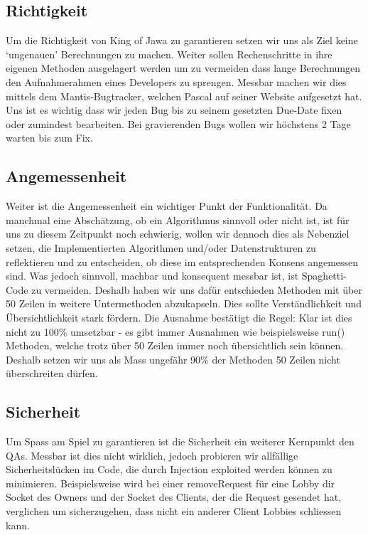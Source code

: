 \documentclass{scrartcl}
\begin{document}
\subsection{Richtigkeit}
\label{sec:Richtigkeit}

Um die Richtigkeit von King of Jawa zu garantieren setzen wir uns als Ziel keine ‘ungenauen’ Berechnungen zu machen. Weiter sollen Rechenschritte in ihre eigenen Methoden ausgelagert werden um zu vermeiden dass lange Berechnungen den Aufnahmerahmen eines Developers zu sprengen. Messbar machen wir dies mittels dem Mantis-Bugtracker, welchen Pascal auf seiner Website aufgesetzt hat. Uns ist es wichtig dass wir jeden Bug bis zu seinem gesetzten Due-Date fixen oder zumindest bearbeiten. Bei gravierenden Bugs wollen wir höchstens 2 Tage warten bis zum Fix. 

\subsection{Angemessenheit}
Weiter ist die Angemessenheit ein wichtiger Punkt der Funktionalität. Da manchmal eine Abschätzung, ob ein Algorithmus sinnvoll oder nicht ist, ist  für uns zu diesem Zeitpunkt noch schwierig, wollen wir dennoch dies als Nebenziel setzen, die Implementierten Algorithmen und/oder Datenstrukturen zu reflektieren und zu entscheiden, ob diese im entsprechenden Konsens angemessen sind. Was jedoch sinnvoll, machbar und konsequent messbar ist, ist Spaghetti-Code zu vermeiden. Deshalb haben wir uns dafür entschieden Methoden mit über 50 Zeilen in weitere Untermethoden abzukapseln. Dies sollte Verständlichkeit und Übersichtlichkeit stark fördern. Die Ausnahme bestätigt die Regel: Klar ist dies nicht zu 100\% umsetzbar - es gibt immer Ausnahmen wie beispielsweise run() Methoden, welche trotz über 50 Zeilen immer noch übersichtlich sein können. Deshalb setzen wir uns als Mass ungefähr 90\% der Methoden 50 Zeilen nicht überschreiten dürfen.

\subsection{Sicherheit}
Um Spass am Spiel zu garantieren ist die Sicherheit ein weiterer Kernpunkt den QAs. Messbar ist dies nicht wirklich, jedoch probieren wir allfällige Sicherheitslücken im Code, die durch Injection exploited werden können zu minimieren. Beispielsweise wird bei einer removeRequest für eine Lobby dir Socket des Owners und der Socket des Clients, der die Request gesendet hat, verglichen um sicherzugehen, dass nicht ein anderer Client Lobbies schliessen kann.
\end{document}
